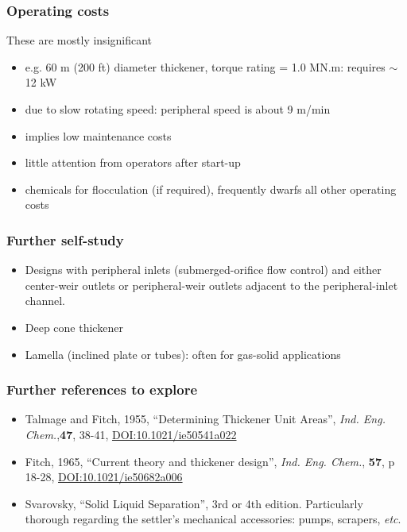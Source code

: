 \begin{frame}\frametitle{Operating costs}
	These are mostly insignificant
	\begin{itemize}
		\item	e.g. 60 m (200 ft) diameter thickener, torque rating = 1.0 MN.m: requires $\sim$ 12 kW
		\item	due to slow rotating speed: peripheral speed is about 9 m/min 
		\item	implies low maintenance costs
		\item	little attention from operators after start-up
		\item	chemicals for flocculation (if required), frequently dwarfs all other operating costs 
	\end{itemize}
\end{frame}

\begin{frame}\frametitle{Further self-study}
	\begin{itemize}
		\item	Designs with peripheral inlets (submerged-orifice flow control) and either center-weir outlets or peripheral-weir outlets adjacent to the peripheral-inlet channel.
		\item	Deep cone thickener
		\item	Lamella (inclined plate or tubes): often for gas-solid applications 
	\end{itemize}
\end{frame}

\begin{frame}\frametitle{Further references to explore}	
	\begin{itemize}
		\item	Talmage and Fitch, 1955, ``Determining Thickener Unit Areas'', \emph{Ind. Eng. Chem.},\textbf{47}, 38-41, \href{http://dx.doi.org/10.1021/ie50541a022}{\small DOI:10.1021/ie50541a022}
		
		\item	Fitch, 1965, ``Current theory and thickener design'', \emph{Ind. Eng. Chem.}, \textbf{57}, p 18-28, \href{http://dx.doi.org/10.1021/ie50682a006}{\small DOI:10.1021/ie50682a006}
		
		\item	Svarovsky, ``Solid Liquid Separation'', 3rd or 4th edition. Particularly thorough regarding the settler's mechanical accessories: pumps, scrapers, \emph{etc}.
	\end{itemize}
\end{frame}

